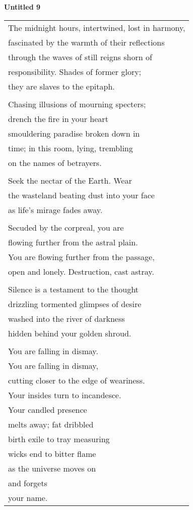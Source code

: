 \documentclass{article}
\begin{document}
\begin{center}
\textbf{Untitled 9} \\
\vspace*{2ex}
\begin{tabular}{l}
The midnight hours, intertwined, lost in harmony, \\
fascinated by the warmth of their reflections \\
through the waves of still reigns shorn of \\
responsibility.  Shades of former glory; \\
they are slaves to the epitaph. \\
\\
Chasing illusions of mourning specters; \\
drench the fire in your heart \\
smouldering paradise broken down in \\
time; in this room, lying, trembling \\
on the names of betrayers. \\
\\
Seek the nectar of the Earth.  Wear \\
the wasteland beating dust into your face \\
as life's mirage fades away. \\
\\
Secuded by the corpreal, you are \\
flowing further from the astral plain. \\ %
You are flowing further from the passage, \\
open and lonely.  Destruction, cast astray. \\
\\
Silence is a testament to the thought \\
drizzling tormented glimpses of desire \\
washed into the river of darkness \\
hidden behind your golden shroud. \\
\\
You are falling in dismay. \\
You are falling in dismay, \\
cutting closer to the edge of weariness. \\
Your insides turn to incandesce. \\
Your candled presence \\
melts away; fat dribbled \\
birth exile to tray measuring \\
wicks end to bitter flame \\
as the universe moves on \\
and forgets \\
your name. \\
\end{tabular}
\end{center}
\end{document}
